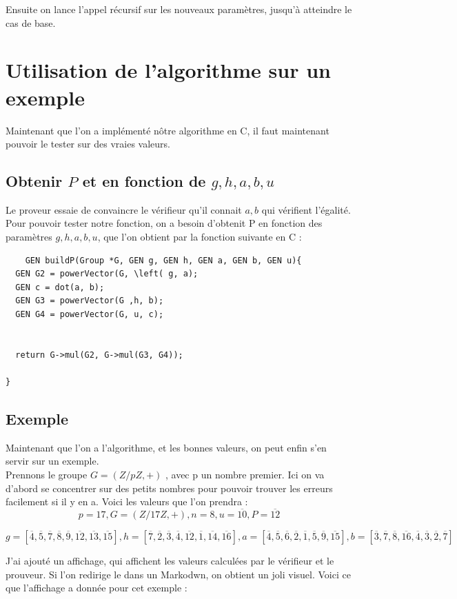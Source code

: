 \documentclass[a4paper]{article}
\theoremstyle{theorem}
\theoremstyle{definition}
\begin{document}
Ensuite on lance l'appel récursif sur les nouveaux paramètres, jusqu'à atteindre le cas de base.


\section{Utilisation de l'algorithme sur un exemple}
Maintenant que l'on a implémenté nôtre algorithme en C, il faut maintenant pouvoir le tester sur des vraies valeurs.
\subsection{Obtenir $P$ et en fonction de $g,h,a,b,u$}
Le proveur essaie de convaincre le vérifieur qu'il connait $a,b$ qui vérifient l'égalité. Pour pouvoir tester notre fonction, on a besoin d'obtenit P en fonction des paramètres $g,h,a,b,u$, que l'on obtient par la fonction suivante en C :
\begin{lstlisting}
    GEN buildP(Group *G, GEN g, GEN h, GEN a, GEN b, GEN u){
  GEN G2 = powerVector(G, \left( g, a);
  GEN c = dot(a, b);
  GEN G3 = powerVector(G ,h, b);
  GEN G4 = powerVector(G, u, c);
 

  return G->mul(G2, G->mul(G3, G4));

}

\end{lstlisting}
\subsection{Exemple}
Maintenant que l'on a l'algorithme, et les bonnes valeurs, on peut enfin s'en servir sur un exemple.\\
Prennons le groupe $G = (Z/pZ, +)$ , avec p un nombre premier. Ici on va d'abord se concentrer sur des petits nombres pour pouvoir trouver les erreurs facilement si il y en a. Voici les valeurs que l'on prendra : 
\[p = 17, G = (Z/17Z, +), n = 8,  u =\overline{10}, P = \overline{12}\]

 \[g=[\overline{4}, \overline{5}, \overline{7}, \overline{8}, \overline{9}, \overline{12}, \overline{13}, \overline{15} ],h = [\overline{7} ,\overline{2} ,\overline{3} ,\overline{4} ,\overline{12} ,\overline{1} ,\overline{14} ,\overline{16} ], a = [\overline{4} ,\overline{5} ,\overline{6} ,\overline{2} ,\overline{1} ,\overline{5} ,\overline{9} ,\overline{15} ] , b = [\overline{3} ,\overline{7} ,\overline{8} ,\overline{16} ,\overline{4} ,\overline{3} ,\overline{2} ,\overline{7}]\]

 J'ai ajouté un affichage, qui affichent les valeurs calculées par le vérifieur et le prouveur. Si l'on redirige le dans un Markodwn, on obtient un joli visuel. Voici ce que l'affichage a donnée pour cet exemple : 
\end{document}
